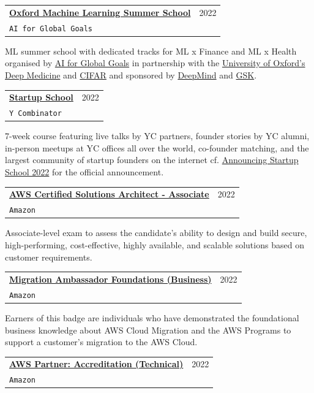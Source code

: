 \documentclass[letterpaper,11pt]{article}
\makeatletter
\newcommand{\resumeSubheading}[4]{
  \vspace{-2pt}\item
    \begin{tabular*}{0.97\textwidth}[t]{l@{\extracolsep{\fill}}r}
      \textbf{#1} & #2 \\
      \texttt{\small#3} & \textit{\small #4} \\
    \end{tabular*}\vspace{-7pt}
}
\makeatother
\begin{document}
    \vspace{2mm}
    \resumeSubheading
      {\href{https://www.oxfordml.school/}{Oxford Machine Learning Summer School}}{2022}
      {AI for Global Goals}{}
    \vspace{2mm}
    
    ML summer school with dedicated tracks for ML x Finance and ML x Health organised by \href{https://www.globalgoals.ai/}{AI for Global Goals} in partnership with the \href{https://www.oxfordmartin.ox.ac.uk/deep-medicine/}{University of Oxford's Deep Medicine} and \href{https://cifar.ca/}{CIFAR} and sponsored by \href{https://www.deepmind.com/}{DeepMind} and \href{https://www.gsk.ai/}{GSK}.
    
    \resumeSubheading
      {\href{startupschool.org/}{Startup School}}{2022}
      {Y Combinator}{}
    \vspace{2mm}
    
    7-week course featuring live talks by YC partners, founder stories by YC alumni, in-person meetups at YC offices all over the world, co-founder matching, and the largest community of startup founders on the internet cf. \href{https://www.ycombinator.com/blog/announcing-startup-school-2022}{Announcing Startup School 2022} for the official announcement.

    \resumeSubheading
      {\href{https://aws.amazon.com/certification/certified-solutions-architect-associate/}{AWS Certified Solutions Architect - Associate}}{2022}
      {Amazon}{}
    \vspace{2mm}
    
    Associate-level exam to assess the candidate's ability to design and build secure, high-performing, cost-effective, highly available, and scalable solutions based on customer requirements.

    \resumeSubheading
      {\href{https://explore.skillbuilder.aws/learn/course/12350/Migration\%2520Ambassador\%2520Foundations\%2520\%28Business\%29}{Migration Ambassador Foundations (Business)}}{2022}
      {Amazon}{}
    \vspace{2mm}
    
    Earners of this badge are individuals who have demonstrated the foundational business knowledge about AWS Cloud Migration and the AWS Programs to support a customer's migration to the AWS Cloud.

    \resumeSubheading
      {\href{https://aws.amazon.com/partners/training/accreditation/}{AWS Partner: Accreditation (Technical)}}{2022}
      {Amazon}{}
    \vspace{2mm}
    
\end{document}
